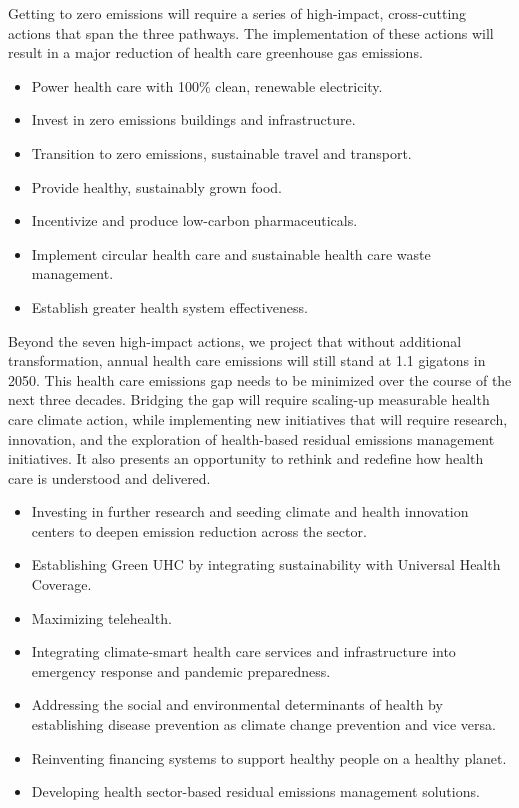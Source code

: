 Getting to zero emissions will require a series of high-impact, cross-cutting actions that span the three pathways. The implementation of these actions will result in a major reduction of health care greenhouse gas emissions.

\begin{itemize}
    \item Power health care with 100\% clean, renewable electricity.
    \item Invest in zero emissions buildings and infrastructure.
    \item Transition to zero emissions, sustainable travel and transport.
    \item Provide healthy, sustainably grown food.
    \item Incentivize and produce low-carbon pharmaceuticals.
    \item Implement circular health care and sustainable health care waste management.
    \item Establish greater health system effectiveness.
\end{itemize}

Beyond the seven high-impact actions, we project that without additional transformation, annual health care emissions will still stand at 1.1 gigatons in 2050. This health care emissions gap needs to be minimized over the course of the next three decades. Bridging the gap will require scaling-up measurable health care climate action, while implementing new initiatives that will require research, innovation, and the exploration of health-based residual emissions management initiatives. It also presents an opportunity to rethink and redefine how health care is understood and delivered.

\begin{itemize}
    \item Investing in further research and seeding climate and health innovation centers to deepen emission reduction across the sector.
    \item Establishing Green UHC by integrating sustainability with Universal Health Coverage.
    \item Maximizing telehealth.
    \item Integrating climate-smart health care services and infrastructure into emergency response and pandemic preparedness.
    \item Addressing the social and environmental determinants of health by establishing disease prevention as climate change prevention and vice versa.
    \item Reinventing financing systems to support healthy people on a healthy planet.
    \item Developing health sector-based residual emissions management solutions.
\end{itemize}

